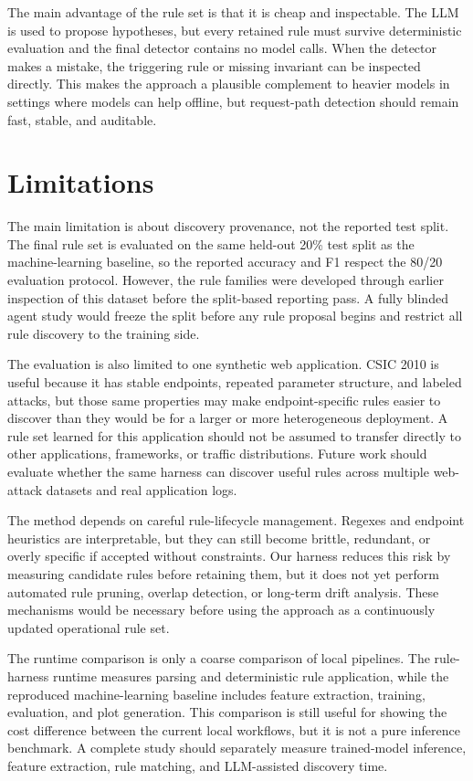 \documentclass[letterpaper,twocolumn,10pt]{article}
\begin{document}
The main advantage of the rule set is that it is cheap and inspectable. The LLM is used to propose hypotheses, but every retained rule must survive deterministic evaluation and the final detector contains no model calls. When the detector makes a mistake, the triggering rule or missing invariant can be inspected directly. This makes the approach a plausible complement to heavier models in settings where models can help offline, but request-path detection should remain fast, stable, and auditable.

\section{Limitations}

The main limitation is about discovery provenance, not the reported test split. The final rule set is evaluated on the same held-out 20\% test split as the machine-learning baseline, so the reported accuracy and F1 respect the 80/20 evaluation protocol. However, the rule families were developed through earlier inspection of this dataset before the split-based reporting pass. A fully blinded agent study would freeze the split before any rule proposal begins and restrict all rule discovery to the training side.

The evaluation is also limited to one synthetic web application. CSIC 2010 is useful because it has stable endpoints, repeated parameter structure, and labeled attacks, but those same properties may make endpoint-specific rules easier to discover than they would be for a larger or more heterogeneous deployment. A rule set learned for this application should not be assumed to transfer directly to other applications, frameworks, or traffic distributions. Future work should evaluate whether the same harness can discover useful rules across multiple web-attack datasets and real application logs.

The method depends on careful rule-lifecycle management. Regexes and endpoint heuristics are interpretable, but they can still become brittle, redundant, or overly specific if accepted without constraints. Our harness reduces this risk by measuring candidate rules before retaining them, but it does not yet perform automated rule pruning, overlap detection, or long-term drift analysis. These mechanisms would be necessary before using the approach as a continuously updated operational rule set.

The runtime comparison is only a coarse comparison of local pipelines. The rule-harness runtime measures parsing and deterministic rule application, while the reproduced machine-learning baseline includes feature extraction, training, evaluation, and plot generation. This comparison is still useful for showing the cost difference between the current local workflows, but it is not a pure inference benchmark. A complete study should separately measure trained-model inference, feature extraction, rule matching, and LLM-assisted discovery time.
\end{document}
